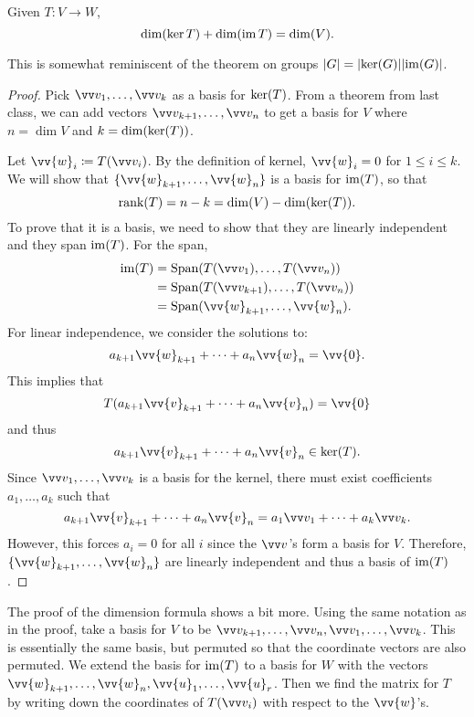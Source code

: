 \begin{theorem}
    Given $T : V \rightarrow W$,
    \[\dim(\operatorname{ker} T ) + \dim (\operatorname{im} T) = \dim (V). \]
\end{theorem}
This is somewhat reminiscent of the theorem on groups $|G| = \lvert\operatorname{ker}(G)\rvert \lvert\operatorname{im}(G)\rvert$.
\begin{proof}
    Pick $\vvv_1, \ldots, \vvv_k$ as a basis for $\operatorname{ker}(T)$. 
    From a theorem from last class, we can add vectors $\vvv_{k+1}, \ldots, \vvv_n$ to get a basis for $V$ where $n = \dim V$ and $k = \dim( \operatorname{ker}(T))$.

    Let $\vv{w}_i \coloneqq T(\vvv_i)$. By the definition of kernel, $\vv{w}_i = 0$ for $1 \leq i \leq k$. 
    We will show that $\{\vv{w}_{k+1}, \ldots, \vv{w}_n \}$ is a basis for $\operatorname{im}(T)$, so that \[\text{rank}(T) = n-k = \dim(V) - \dim(\operatorname{ker}(T)). \] 
    To prove that it is a basis, we need to show that they are linearly independent and they span $\operatorname{im}(T)$.
    For the span,
    \begin{align*}
        \im(T) &= \spann(T(\vvv_1), \ldots, T(\vvv_n))\\
               &= \spann(T(\vvv_{k+1}), \ldots, T(\vvv_n)) \\
               &= \spann(\vv{w}_{k+1}, \ldots, \vv{w}_n).
    \end{align*}
    For linear independence, we consider the solutions to: 
    \[ a_{k+1} \vv{w}_{k+1} + \cdots + a_n \vv{w}_n = \vv{0}. \]
    This implies that 
    \[ T(a_{k+1} \vv{v}_{k+1} + \cdots + a_n \vv{v}_n) = \vv{0} \]
    and thus 
    \[ a_{k+1} \vv{v}_{k+1} + \cdots + a_n \vv{v}_n \in \Ker(T) .\]
    Since $\vvv_1, \ldots, \vvv_k$ is a basis for the kernel, there must exist coefficients $a_1, \ldots, a_k$ such that 
    \[ a_{k+1} \vv{v}_{k+1} + \cdots + a_n \vv{v}_n = a_1 \vvv_1 + \cdots + a_k \vvv_k. \]
    However, this forces $a_i = 0$ for all $i$ since the $\vvv$'s form a basis for $V$. 
    Therefore, $\{\vv{w}_{k+1}, \ldots, \vv{w}_n \}$ are linearly independent and thus a basis of $\operatorname{im}(T)$.
\end{proof}
The proof of the dimension formula shows a bit more. 
Using the same notation as in the proof, take a basis for $V$ to be $\vvv_{k+1}, \ldots, \vvv_n, \vvv_1, \ldots, \vvv_k$. This is essentially the same basis, but permuted so that the coordinate vectors are also permuted. 
We extend the basis for $\operatorname{im}(T)$ to a basis for $W$ with the vectors $\vv{w}_{k+1} , \ldots, \vv{w}_n, \vv{u}_1, \ldots, \vv{u}_r$. 
Then we find the matrix for $T$ by writing down the coordinates of $T(\vvv_i)$ with respect to the $\vv{w}$'s. 

